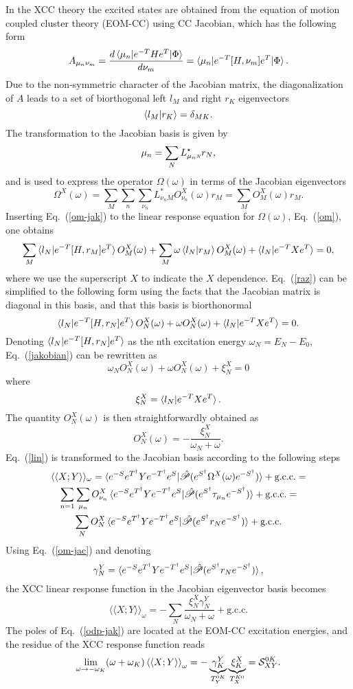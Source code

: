 \documentclass[preprint,12pt]{elsarticle}
\newcommand{\SSS}{\mathcal{S}}
\newcommand{\proj}{\hat{\mathscr{P}}}
\newcommand{\comute}[2]{ [ #1,#2]}
\newcommand{\equ}[1]{\begin{equation} #1 \end{equation}}
\newcommand{\equl}[2]{\begin{equation}\label{#2} #1 \end{equation}}
\newcommand{\equml}[2]{\begin{multline}\label{#2} #1 \end{multline}}
\newcommand{\fr}[1]{Eq.~(\ref{#1})}
\newcommand{\rar}{\rightarrow}
\newcommand{\odp}{\braket{\braket{X;Y}}_\omega}
\newcommand{\Omx}{\Omega^X(\omega)}
\newcommand{\Omm}{\Omega(\omega)}
\begin{document}
In the XCC theory the excited states are obtained from the equation of motion coupled cluster theory (EOM-CC)
using CC Jacobian,\cite{sekino1984linear, koch1990coupled, helgaker2013molecular}
which  has the following form
\equl{A_{\mu_n\nu_m} =\frac{d \braket{\mu_n|e^{-T}H e^T|\Phi}}{d\nu_m} =  \braket{\mu_n|e^{-T}[H,\nu_m]e^T|\Phi}.
}{jac}
Due to the non-symmetric character of the Jacobian matrix, the diagonalization of $A$ leads to a
set of biorthogonal left $l_M$ and right $r_K$ eigenvectors
\equ{\braket{l_M|r_K} = \delta_{MK}.
  }
The transformation to the Jacobian basis is given by
\equ{\mu_n = \sum_{N}L^\star_{\mu_n \mbox{\tiny{\emph{N}}}} r_N,
  }
and is used to express the operator $\Omega(\omega)$ in terms of the Jacobian eigenvectors
\equl{
\Omx = \sum_M \sum_n\sum_{\nu_n} L_{\nu_n M}^*O_{\nu_n}^X(\omega) r_{M} = \sum_{M} O_{M}^X(\omega) r_{M}.
}{om-jak}
Inserting \fr{om-jak} to the linear response equation for $\Omm$, \fr{om}, one obtains
\equl{
\sum_{M}\braket{l_N|e^{-T}\comute{ H }{r_M}e^T}O_M^X(\omega) + \sum_{M}\omega\braket{l_N|r_M}O_M^X(\omega)
  + \braket{l_N|e^{-T}Xe^T} = 0,
}{raz}
where we use the superscript $X$ to indicate the $X$ dependence.
\fr{raz} can be simplified to the following form using the facts that the Jacobian matrix is diagonal in this basis,
and that this basis is biorthonormal
\equl{
\braket{l_N|e^{-T}\comute{ H }{r_N}e^T}O_N^X(\omega) +
\omega O_N^X(\omega)
  + \braket{l_N|e^{-T}Xe^T} = 0.
}{jakobian}
Denoting $\braket{l_N|e^{-T}\comute{ H }{r_N}e^T}$ as the nth excitation energy  $\omega_N =E_N - E_0 $, \fr{jakobian} can be rewritten as
\equ{
\omega_NO_N^X(\omega) +
\omega O_N^X(\omega)
  + \xi_N^X= 0
}
where 
\equl{\xi_N^X = \braket{l_N|e^{-T}Xe^T}.
}{xin}
The quantity $O_N^X(\omega)$ is then straightforwardly obtained as
\equl{
O_N^X(\omega) = - \frac{\xi_N^X }{\omega_N + \omega}.
}{om-jac}
\fr{lin} is  transformed to the Jacobian basis according to the following steps
\equml{
\langle\langle X;Y\rangle\rangle_\omega =
\braket{e^{-S}e^{T^\dagger}Ye^{-T^\dagger}e^{S}|\proj(e^{S^\dagger}\Omx e^{-S^\dagger})} + \mbox{g.c.c.} = \\
\sum_{n=1}\sum_{\mu_n}O^X_{\nu_n} \braket{e^{-S}e^{T^\dagger}Ye^{-T^\dagger}e^{S}|\proj(e^{S^\dagger}\tau_{\mu_n} e^{-S^\dagger})} + \mbox{g.c.c.} = \\
\sum_{N}O^X_{N} \braket{e^{-S}e^{T^\dagger}Ye^{-T^\dagger}e^{S}|\proj(e^{S^\dagger}r_N e^{-S^\dagger})} + \mbox{g.c.c.} 
}{trz}
Using \fr{om-jac} and
denoting
\equl{\gamma_{N}^Y = \braket{e^{-S}e^{T^\dagger}Ye^{-T^\dagger}e^{S}|\proj(e^{S^\dagger}r_N e^{-S^\dagger})},
  }{gamma3}
the XCC linear response function in the Jacobian eigenvector basis  becomes
\equl{
\langle\langle X;Y\rangle\rangle_\omega =
-\sum_N \frac{\xi_N^X \gamma_N^Y }{\omega_N + \omega}+ \mbox{g.c.c.}
}{odp-jak}
The poles of
\fr{odp-jak} are located at the
EOM-CC\cite{stanton1993equation} excitation energies, and 
the residue of the XCC response function reads 
\equ{
\lim_{\omega
  \rar -\omega_K}(\omega + \omega_K)\odp=
 -\underbrace{\gamma_{K}^Y}_{ T_Y^{0K}}
\underbrace{\xi_{K}^X}_{T_X^{K0}} =  \SSS_{XY}^{0K}.
}
\end{document}
